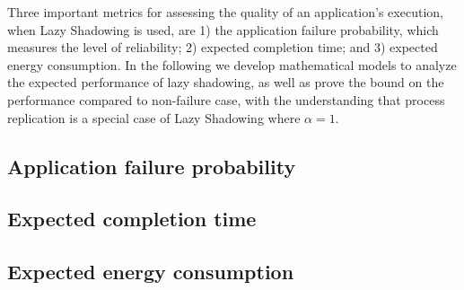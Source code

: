Three important metrics for assessing the quality of an application's execution, when Lazy Shadowing is used, are 1) the application failure probability, which measures the level of reliability; 2) expected completion time; and 3) expected energy consumption. In the following we develop mathematical models to analyze the expected performance of lazy shadowing, as well as prove the bound on the performance compared to non-failure case, with the understanding
that process replication is a special case of Lazy Shadowing where $\alpha=1$. 



\subsection{Application failure probability}
\label{anal_app_fail}


\subsection{Expected completion time}
\label{anal_time}


\subsection{Expected energy consumption}
\label{anal_energy}

